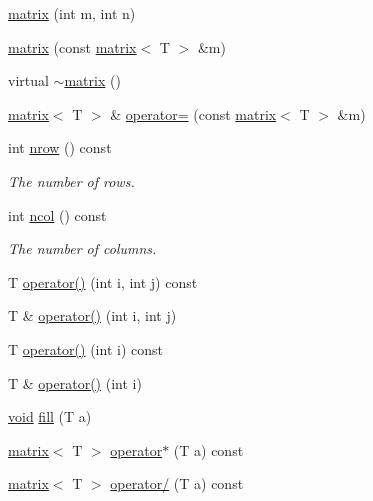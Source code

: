\begin{DoxyCompactItemize}
\item 
\hyperlink{classlibNumerics_1_1matrix_a628bc8789bcdf010406027916b09ad1c}{matrix} (int m, int n)
\item 
\hyperlink{classlibNumerics_1_1matrix_a54748c58afab86536812d3488030a1da}{matrix} (const \hyperlink{classlibNumerics_1_1matrix}{matrix}$<$ T $>$ \&m)
\item 
virtual \hyperlink{classlibNumerics_1_1matrix_a766b4304af755c1c8a5859fcb501c9c1}{$\sim$matrix} ()
\item 
\hyperlink{classlibNumerics_1_1matrix}{matrix}$<$ T $>$ \& \hyperlink{classlibNumerics_1_1matrix_a4e57606438dd5b147530e4ceb71d6697}{operator=} (const \hyperlink{classlibNumerics_1_1matrix}{matrix}$<$ T $>$ \&m)
\item 
int \hyperlink{classlibNumerics_1_1matrix_a8597e7b395501191215321e68efdde67}{nrow} () const 
\begin{DoxyCompactList}\small\item\em The number of rows. \end{DoxyCompactList}\item 
int \hyperlink{classlibNumerics_1_1matrix_aa5ab58454cdedcd1141f4b6118d5341b}{ncol} () const 
\begin{DoxyCompactList}\small\item\em The number of columns. \end{DoxyCompactList}\item 
T \hyperlink{classlibNumerics_1_1matrix_a17993222c44569236a6e95b1fdc3f739}{operator()} (int i, int j) const 
\item 
T \& \hyperlink{classlibNumerics_1_1matrix_a45e6de777eea44f80b07bc95080d965b}{operator()} (int i, int j)
\item 
T \hyperlink{classlibNumerics_1_1matrix_a77efab5d0c743c50103f49339f6dcd9e}{operator()} (int i) const 
\item 
T \& \hyperlink{classlibNumerics_1_1matrix_aab2b350c54be9b0c97daaf6682acb806}{operator()} (int i)
\item 
\hyperlink{png_8h_aa8c59027f9ab2769342f248709d68d17}{void} \hyperlink{classlibNumerics_1_1matrix_a5da6aeb9e4f7e2340344be209878da21}{fill} (T a)
\item 
\hyperlink{classlibNumerics_1_1matrix}{matrix}$<$ T $>$ \hyperlink{classlibNumerics_1_1matrix_ad2640e142aa1d18de84208bbe99b131f}{operator$\ast$} (T a) const 
\item 
\hyperlink{classlibNumerics_1_1matrix}{matrix}$<$ T $>$ \hyperlink{classlibNumerics_1_1matrix_af336615a994f9450a917772ae19e52e8}{operator/} (T a) const 

\end{DoxyCompactItemize}
